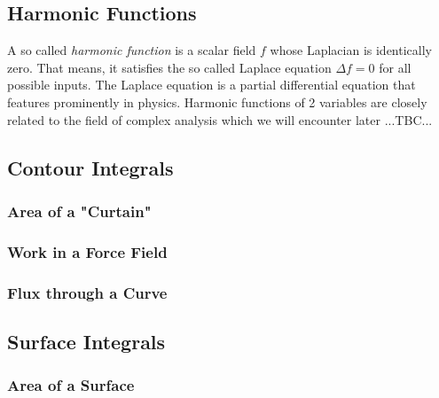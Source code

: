 


\subsection{Harmonic Functions}
A so called \emph{harmonic function} is a scalar field $f$ whose Laplacian is identically zero. That means, it satisfies the so called Laplace equation $\Delta f = 0$ for all possible inputs. The Laplace equation is a partial differential equation that features prominently in physics. Harmonic functions of 2 variables are closely related to the field of complex analysis which we will encounter later ...TBC...


\subsection{Contour Integrals}
\subsubsection{Area of a "Curtain"}
\subsubsection{Work in a Force Field}
\subsubsection{Flux through a Curve}

\subsection{Surface Integrals}
\subsubsection{Area of a Surface}
